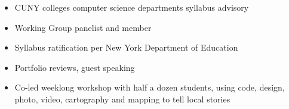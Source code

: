\documentclass[a4paper,10pt]{memoir} %
\begin{document}
\begin{itemize}
	\item CUNY colleges computer science departments syllabus advisory 
	\item Working Group panelist and member
\end{itemize}

\Sep %

\begin{itemize}
	\item Syllabus ratification per New York Department of Education 
	\item Portfolio reviews, guest speaking
\end{itemize}

\Sep %


\begin{itemize}
	\item Co-led weeklong workshop with half a dozen students, using code, design, photo, video, cartography and mapping to tell local stories
\end{itemize}


\Sep %




\Sep %




\end{document}
